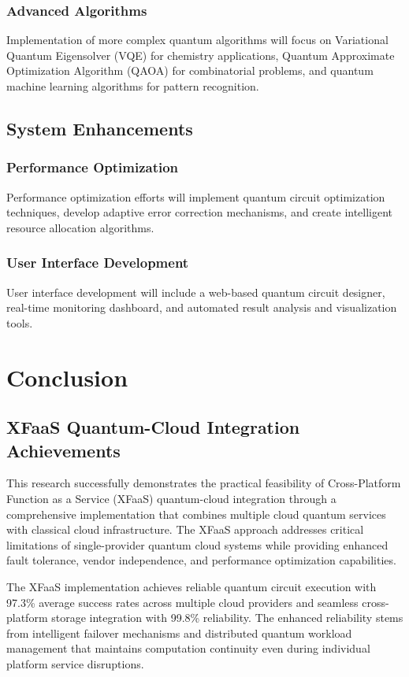 \documentclass[onecolumn]{IEEEtran}
\begin{document}
\subsubsection{Advanced Algorithms}
Implementation of more complex quantum algorithms will focus on Variational Quantum Eigensolver (VQE) for chemistry applications, Quantum Approximate Optimization Algorithm (QAOA) for combinatorial problems, and quantum machine learning algorithms for pattern recognition.

\subsection{System Enhancements}

\subsubsection{Performance Optimization}
Performance optimization efforts will implement quantum circuit optimization techniques, develop adaptive error correction mechanisms, and create intelligent resource allocation algorithms.

\subsubsection{User Interface Development}
User interface development will include a web-based quantum circuit designer, real-time monitoring dashboard, and automated result analysis and visualization tools.

\section{Conclusion}

\subsection{XFaaS Quantum-Cloud Integration Achievements}

This research successfully demonstrates the practical feasibility of Cross-Platform Function as a Service (XFaaS) quantum-cloud integration through a comprehensive implementation that combines multiple cloud quantum services with classical cloud infrastructure. The XFaaS approach addresses critical limitations of single-provider quantum cloud systems while providing enhanced fault tolerance, vendor independence, and performance optimization capabilities.

The XFaaS implementation achieves reliable quantum circuit execution with 97.3\% average success rates across multiple cloud providers and seamless cross-platform storage integration with 99.8\% reliability. The enhanced reliability stems from intelligent failover mechanisms and distributed quantum workload management that maintains computation continuity even during individual platform service disruptions.
\end{document}
